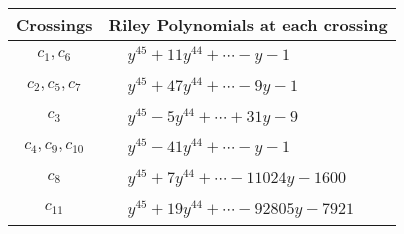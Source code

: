 \documentclass[1p]{elsarticle_modified}
\theoremstyle{definition}
\begin{document}
\begin{tabular}{m{50pt}|m{274pt}}
Crossings & \hspace{64pt}Riley Polynomials at each crossing \\
\hline $$\begin{aligned}c_{1},c_{6}\end{aligned}$$&$\begin{aligned}
&y^{45}+11 y^{44}+\cdots- y-1
\end{aligned}$\\
\hline $$\begin{aligned}c_{2},c_{5},c_{7}\end{aligned}$$&$\begin{aligned}
&y^{45}+47 y^{44}+\cdots-9 y-1
\end{aligned}$\\
\hline $$\begin{aligned}c_{3}\end{aligned}$$&$\begin{aligned}
&y^{45}-5 y^{44}+\cdots+31 y-9
\end{aligned}$\\
\hline $$\begin{aligned}c_{4},c_{9},c_{10}\end{aligned}$$&$\begin{aligned}
&y^{45}-41 y^{44}+\cdots- y-1
\end{aligned}$\\
\hline $$\begin{aligned}c_{8}\end{aligned}$$&$\begin{aligned}
&y^{45}+7 y^{44}+\cdots-11024 y-1600
\end{aligned}$\\
\hline $$\begin{aligned}c_{11}\end{aligned}$$&$\begin{aligned}
&y^{45}+19 y^{44}+\cdots-92805 y-7921
\end{aligned}$\\
\hline
\end{tabular}
\vskip 2pc
\end{document}

